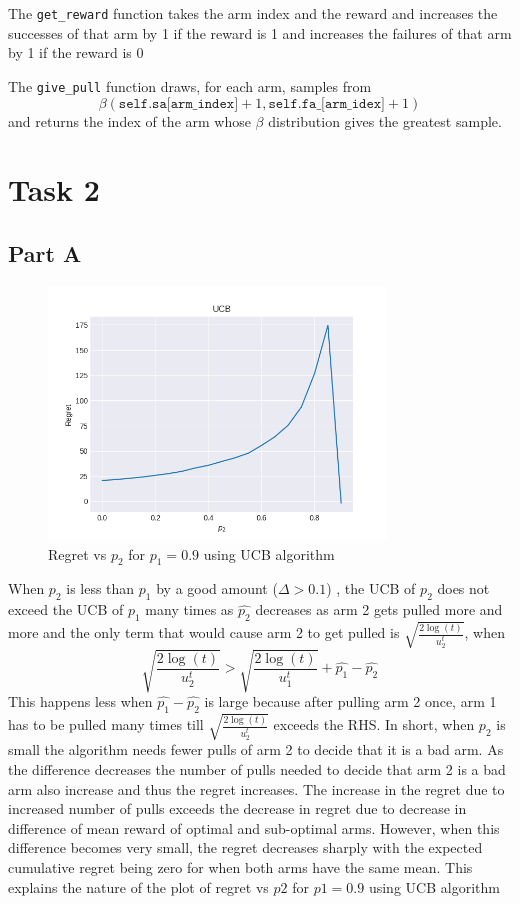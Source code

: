 \documentclass[11pt]{article}
\begin{document}
\noindent The \texttt{get\_reward} function takes the arm index and the reward and increases the successes of
that arm by 1 if the reward is 1 and increases the failures of that arm by 1 if the reward is 0

\noindent The \texttt{give\_pull} function draws, for each arm, samples from 
$$\beta(\texttt{self.sa[arm\_index]}+1,\texttt{self.fa\_[arm\_idex]}+1)$$
and returns the index of the arm whose $\beta$ distribution gives the greatest sample.
\section*{Task 2}
\subsection*{Part A}
\begin{figure}[H]
    \begin{center}
        \includegraphics[width=0.8\textwidth]{../images/task2a.png}
        
        \caption{Regret vs $p_2$ for $p_1 = 0.9$ using UCB algorithm}
    \end{center}
 \end{figure}


 When $p_2$ is less than $p_1$ by a good amount ($\Delta > 0.1$) , 
 the UCB of $p_2$ does not exceed the UCB of $p_1$ many times as $\hat{p_2}$ decreases
 as arm 2 gets pulled more and more and the only term that would cause arm 2 to get pulled
 is $\sqrt{\frac{2 \log(t)}{u_2^t}}$, when 
 $$\sqrt{\frac{2 \log(t)}{u_2^t}} > \sqrt{\frac{2 \log(t)}{u_1^t}} + \hat{p_1} - \hat{p_2}$$
 This happens less when $\hat{p_1} - \hat{p_2}$ is large because after pulling arm 2 once,
 arm 1 has to be pulled many times till  $\sqrt{\frac{2 \log(t)}{u_2^t}}$ exceeds the RHS. In short, when $p_2$ is 
 small the algorithm needs fewer pulls of arm 2 to decide that it is a bad arm. As the difference decreases
 the number of pulls needed to decide that arm 2 is a bad arm also increase and thus the regret increases. The increase in the regret due to increased 
 number of pulls exceeds the decrease in regret due to decrease in difference of mean reward of optimal and sub-optimal arms. However, when this difference becomes very small,
 the regret decreases sharply with the expected cumulative regret being zero for when both arms have the same mean. This explains the nature of the plot 
 of regret vs $p2$ for $p1 = 0.9$ using UCB algorithm
\end{document}

